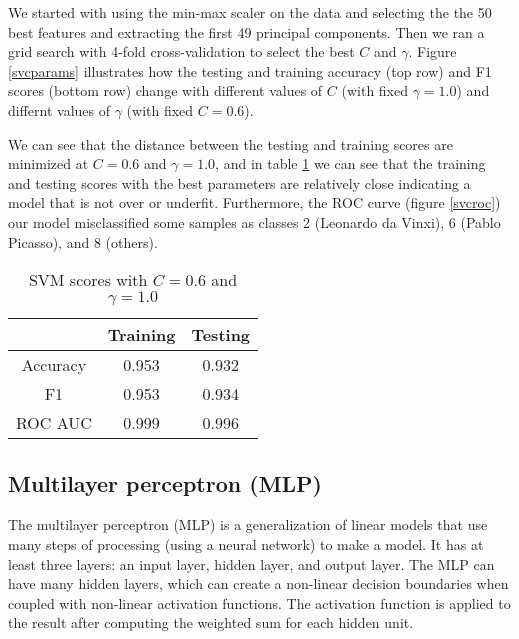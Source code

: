 \documentclass[12pt]{article}
\begin{document}
We started with using the min-max scaler on the data and selecting the the 50 best features and extracting the first 49 principal components. Then we ran a grid search with 4-fold cross-validation to select the best $C$ and $\gamma$. Figure \ref{svcparams} illustrates how the testing and training accuracy (top row) and F1 scores (bottom row) change with different values of $ C $ (with fixed $\gamma=1.0$) and differnt values of $\gamma$ (with fixed $C=0.6$).

We can see that the distance between the testing and training scores are minimized at $C=0.6$ and $\gamma=1.0$, and in table \ref{table: 7} we can see that the training and testing scores with the best parameters are relatively close indicating a model that is not over or underfit. Furthermore, the ROC curve (figure \ref{svcroc}) our model misclassified some samples as classes 2 (Leonardo da Vinxi), 6 (Pablo Picasso), and 8 (others).

\begin{table}[h!]
	\centering
	\begin{tabular}{| c|cc|} 
		\hline
		& Training & Testing\\ \hline
		Accuracy & 0.953 &0.932 \\ 
		F1 &  0.953 &0.934\\ 
		ROC AUC & 0.999 &0.996\\
		\hline
	\end{tabular}
	\caption{SVM scores with $C=0.6$ and $\gamma =1.0$}
	\label{table: 7}
\end{table}
\FloatBarrier

\subsection{Multilayer perceptron (MLP)}

The multilayer perceptron (MLP) is a generalization of linear models that use many steps of processing (using a neural network) to make a model. It has at least three layers: an input layer, hidden layer, and output layer. The MLP can have many hidden layers, which can create a non-linear decision boundaries when coupled with non-linear activation functions. The activation function is applied to the result after computing the weighted sum for each hidden unit.
\end{document}
